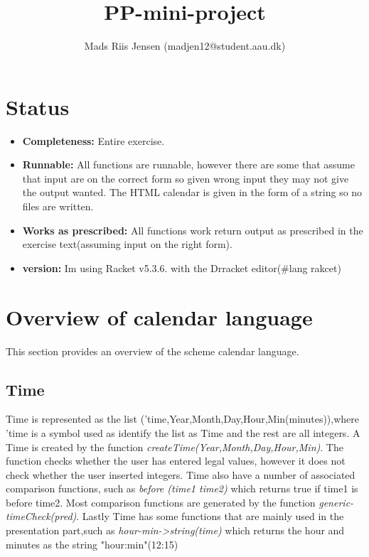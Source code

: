 \documentclass[a4paper]{article}
\begin{document}
\author{Mads Riis Jensen (madjen12@student.aau.dk)}
\title{PP-mini-project}
\maketitle

\section*{Status}
\begin{itemize}
\item \textbf{Completeness:} Entire exercise.
\item \textbf{Runnable:} All functions are runnable, however there are some that assume that input are on the correct form so given wrong input they may not give the output wanted. The HTML calendar is given in the form of a string so no files are written.   
\item \textbf{Works as prescribed:} All functions work return output as prescribed in the exercise text(assuming input on the right form).
\item \textbf{version:} Im using Racket v5.3.6. with the Drracket editor(\#lang rakcet) 
\end{itemize}

\section{Overview of calendar language}

This section provides an overview of the scheme calendar language.

\subsection{Time}

Time is represented as the list ('time,Year,Month,Day,Hour,Min(minutes)),where 'time is a symbol used as identify the list as Time and the rest are all integers. A Time is created by the function \textit{createTime(Year,Month,Day,Hour,Min)}. The function checks whether the user has entered legal values, however it does not check whether the user inserted integers. Time also have a number of associated comparison functions, such as \textit{before (time1 time2)} which returns true if time1 is before time2. Most comparison functions are generated by the function \textit{generic-timeCheck(pred)}. Lastly Time has some functions that are mainly used in the presentation part,such as \textit{hour-min->string(time)} which returns the hour and minutes as the string "hour:min"(12:15) 
\end{document}
